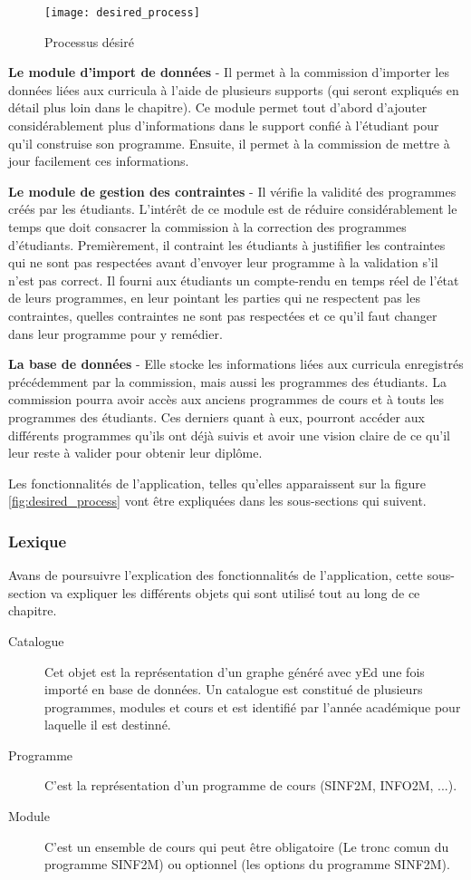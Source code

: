 \begin{figure}
\centering
\caption{Processus désiré}
\label{fig:desired_process_2}
\texttt{[image: desired\_process]}
\end{figure}

\textbf{Le module d'import de données} - Il permet à la commission d'importer les données liées aux curricula  à l'aide de plusieurs supports (qui seront expliqués en détail plus loin dans le chapitre). Ce module permet tout d'abord d'ajouter considérablement plus d'informations dans le support confié à l'étudiant pour qu'il construise son programme. Ensuite, il permet à la commission de mettre à jour facilement ces informations. 
 
\textbf{Le module de gestion des contraintes} - Il vérifie la validité des programmes créés par les étudiants. L'intérêt de ce module est de réduire considérablement  le temps que doit consacrer la commission à la correction des programmes d'étudiants. Premièrement, il contraint les étudiants à justififier les contraintes qui ne sont pas respectées avant d'envoyer leur programme à la validation s'il n'est pas correct. Il fourni aux étudiants un compte-rendu en temps réel de l'état de leurs programmes, en leur pointant les parties qui ne respectent pas les contraintes, quelles contraintes ne sont pas respectées et ce qu'il faut changer dans leur programme pour y remédier.

\textbf{La base de données} - Elle stocke les informations liées aux curricula enregistrés précédemment par la commission, mais aussi les programmes des étudiants. La commission pourra avoir accès aux anciens programmes de cours et à touts les programmes des étudiants. Ces derniers quant à eux, pourront accéder aux différents programmes qu'ils ont déjà suivis et avoir une vision claire de ce qu'il leur reste à valider pour obtenir leur diplôme.

Les fonctionnalités de l'application, telles qu'elles apparaissent sur la figure \ref{fig:desired_process} vont être expliquées dans les sous-sections qui suivent.

\subsubsection{Lexique}
Avans de poursuivre l'explication des fonctionnalités de l'application, cette sous-section va expliquer les différents objets qui sont utilisé tout au long de ce chapitre.
\begin{description}
\item[Catalogue] Cet objet est la représentation d'un graphe généré avec yEd une fois importé en base de données. Un catalogue est constitué de plusieurs programmes, modules et cours et est identifié par l'année académique pour laquelle il est destinné. 
\item[Programme] C'est la représentation d'un programme de cours (SINF2M, INFO2M, ...).
\item[Module] C'est un ensemble de cours qui peut être obligatoire (Le tronc comun du programme SINF2M) ou optionnel (les options du programme SINF2M).
\end{description}
